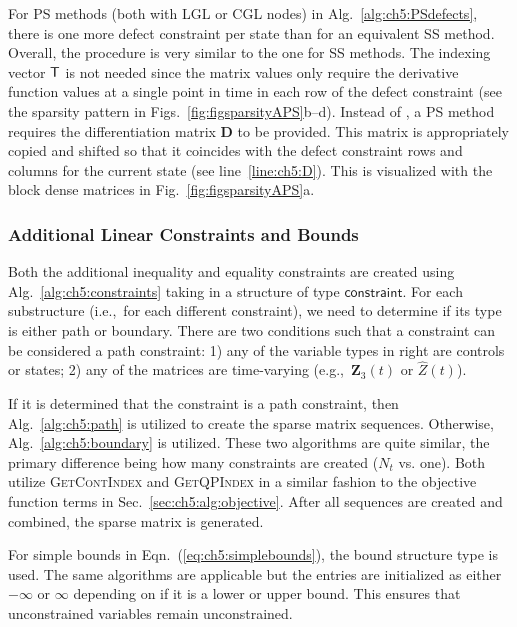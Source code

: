 For PS methods (both with LGL or CGL nodes) in Alg.~\ref{alg:ch5:PSdefects}, there is one more defect constraint per state than for an equivalent SS method.
Overall, the procedure is very similar to the one for SS methods.
The indexing vector $\textup{\textsf{T}}$ is not needed since the matrix values only require the derivative function values at a single point in time in each row of the defect constraint (see the sparsity pattern in Figs.~\ref{fig:figsparsityAPS}b--d).
Instead of , a PS method requires the differentiation matrix $\bm{D}$ to be provided.
This matrix is appropriately copied and shifted so that it coincides with the defect constraint rows and columns for the current state (see line~\ref{line:ch5:D}).
This is visualized with the block dense matrices in Fig.~\ref{fig:figsparsityAPS}a.

\subsubsection{Additional Linear Constraints and Bounds} \label{sec:ch5:alg:lin:constraints}

Both the additional inequality and equality constraints are created using Alg.~\ref{alg:ch5:constraints} taking in a structure of type $\textsf{constraint}$.
For each substructure (i.e.,~for each different constraint), we need to determine if its type is either path or boundary.
There are two conditions such that a constraint can be considered a path constraint: 1) any of the variable types in \textsf{right} are controls or states; 2) any of the matrices are time-varying (e.g.,~$\bm{Z}_3(t)$ or $\hat{Z}(t)$).

If it is determined that the constraint is a path constraint, then Alg.~\ref{alg:ch5:path} is utilized to create the sparse matrix sequences.
Otherwise, Alg.~\ref{alg:ch5:boundary} is utilized.
These two algorithms are quite similar, the primary difference being how many constraints are created ($N_t$ vs. one).
Both utilize \textsc{GetContIndex} and \textsc{GetQPIndex} in a similar fashion to the objective function terms in Sec.~\ref{sec:ch5:alg:objective}.
After all sequences are created and combined, the sparse matrix is generated.

For simple bounds in Eqn.~(\ref{eq:ch5:simplebounds}), the \textsf{bound} structure type is used.
The same algorithms are applicable but the entries are initialized as either $-\infty$ or $\infty$ depending on if it is a lower or upper bound.
This ensures that unconstrained variables remain unconstrained.